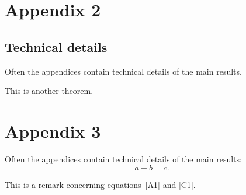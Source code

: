 \documentclass[article,lineno]{biometrika}
\begin{document}
\appendixtwo
\section*{Appendix 2}
\subsection*{Technical details}

Often the appendices contain technical details of the main results.

\begin{theorem}
This is another theorem.
\end{theorem}

\appendixthree
\section*{Appendix 3}

Often the appendices contain technical details of the main results:
\begin{equation}
\label{C1}
a + b = c.
\end{equation}

\begin{remark}
This is a remark concerning equations~\eqref{A1} and \eqref{C1}.
\end{remark}

%
%
\end{document}
